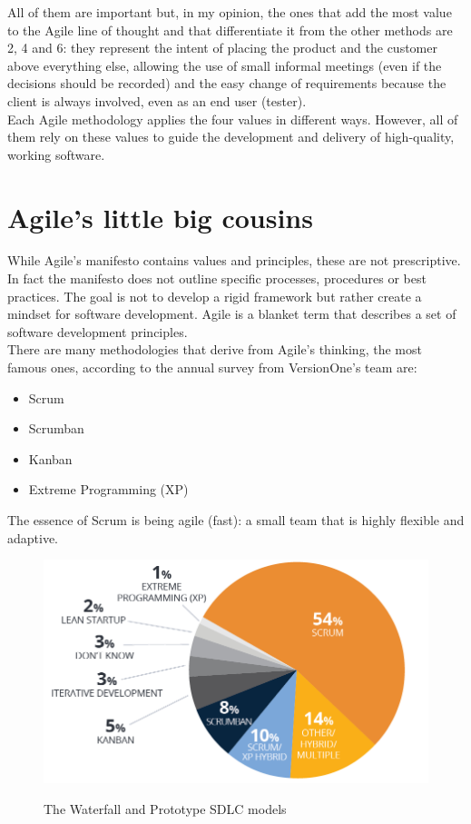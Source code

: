 	All of them are important but, in my opinion, the ones that add the most value to the Agile line of thought and that differentiate it from the other methods are 2, 4 and 6: they represent the intent of placing the product and the customer above everything else, allowing the use of small informal meetings (even if the decisions should be recorded) and the easy change of requirements because the client is always involved, even as an end user (tester).\\
	Each Agile methodology applies the four values in different ways.
	However, all of them rely on these values to guide the development and delivery of high-quality, working software\cite{4-values-of-the-agile-manifesto}.

\section{Agile's little big cousins}
	While Agile's manifesto contains values and principles, these are not prescriptive.
	In fact the manifesto does not outline specific processes, procedures or best practices.
	The goal is not to develop a rigid framework but rather create a mindset for software development.
	Agile is a blanket term that describes a set of software development principles.\\
	There are many methodologies that derive from Agile's thinking, the most famous ones, according to the annual survey\cite{state-of-agile} from VersionOne's team are:
	\begin{itemize}
		\item Scrum
		\item Scrumban
		\item Kanban
		\item Extreme Programming (XP)
	\end{itemize}
	The essence of Scrum is being agile (fast): a small team that is highly flexible and adaptive.
	\begin{figure}[H]
		\centering
		\includegraphics[width=.8\textwidth]{resources/agile-usage-chart}\\
		\caption{The Waterfall and Prototype SDLC models}
	\end{figure}

